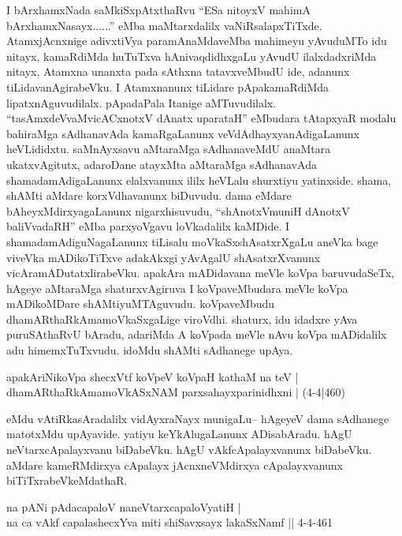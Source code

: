 \begin{artha}
I bArxhamxNada saMkiSxpAtxthaRvu ``ESa nitoyxV mahimA bArxhamxNasayx......'' eMba maMtarxdalilx vaNiRsalapxTiTxde. AtamxjAcnxnige adivxtiVya paramAnaMdaveMba mahimeyu yAvuduMTo idu nitayx, kamaRdiMda huTuTxva hAnivaqdidhxgaLu yAvudU ilalxdadxriMda nitayx, Atamxna unanxta pada sAthxna tatavxveMbudU ide, adanunx tiLidavanAgirabeVku. I Atamxnanunx tiLidare pApakamaRdiMda lipatxnAguvudilalx. pApadaPala Itanige aMTuvudilalx. ``tasAmxdeVvaMvicACxnotxV dAnatx uparataH'' eMbudara tAtapxyaR modalu bahiraMga sAdhanavAda kamaRgaLanunx veVdAdhayxyanAdigaLanunx heVLididxtu. saMnAyxsavu aMtaraMga sAdhanaveMdU anaMtara ukatxvAgitutx, adaroDane atayxMta aMtaraMga sAdhanavAda shamadamAdigaLanunx elalxvanunx ililx heVLalu shurxtiyu yatinxside. shama, shAMti aMdare korxVdhavanunx biDuvudu. dama eMdare bAheyxMdirxyagaLanunx nigarxhisuvudu, ``shAnotxVmuniH dAnotxV baliVvadaRH'' eMba parxyoVgavu loVkadalilx kaMDide. I shamadamAdiguNagaLanunx tiLisalu moVkaSxshAsatxrXgaLu aneVka bage viveVka mADikoTiTxve adakAkxgi yAvAgalU shAsatxrXvanunx vicAramADutatxlirabeVku. apakAra mADidavana meVle koVpa baruvudaSeTx, hAgeye aMtaraMga shaturxvAgiruva I koVpaveMbudara meVle koVpa mADikoMDare shAMtiyuMTAguvudu. koVpaveMbudu dhamARthaRkAmamoVkaSxgaLige viroVdhi. shaturx, idu idadxre yAva puruSAthaRvU bAradu, adariMda A koVpada meVle nAvu koVpa mADidalilx adu himemxTuTxvudu. idoMdu shAMti sAdhanege upAya. 
\end{artha}

\begin{shl}
apakAriNikoVpa shecxVtf koVpeV koVpaH kathaM na teV |\\
dhamARthaRkAmamoVkASxNAM parxsahayxparinidhxni | (4-4|460)
\end{shl}

\begin{artha}
eMdu vAtiRkasAradalilx vidAyxraNayx munigaLu-- hAgeyeV dama sAdhanege matotxMdu upAyavide. yatiyu keYkAlugaLanunx ADisabAradu. hAgU neVtarxcApalayxvanu biDabeVku. hAgU vAkfcApalayxvanunx biDabeVku. aMdare kameRMdirxya cApalayx jAcnxneVMdirxya cApalayxvanunx biTiTxrabeVkeMdathaR. 
\end{artha}

\begin{shl}
na pANi pAdacapaloV naneVtarxcapaloVyatiH |\\
na ca vAkf capalashecxYva miti shiSavxsayx lakaSxNamf || 4-4-461
\end{shl}


